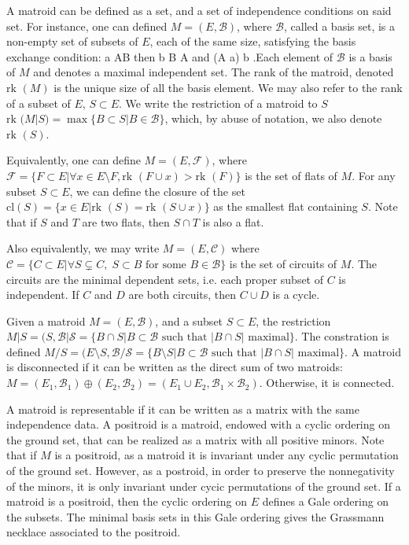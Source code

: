 \documentclass[11pt]{article}
\newcommand{\rk}{\textrm{rk }}
\def\bas #1\eas{\begin{align*} #1 \end{align*}}
\theoremstyle{remark}
\theoremstyle{definition}
\begin{document}
A matroid can be defined as a set, and a set of independence conditions on said set. For instance, one can defined $M = (E, \mathcal{B})$, where $\mathcal{B}$, called a basis set, is a non-empty set of subsets of $E$, each of the same size, satisfying the basis exchange condition: \bas \textrm{ if }  a \in A\setminus B \textrm{ then } \exists b \in B \setminus A \textrm{ and } (A \setminus a) \cup b \in  {} \;.\eas Each element of $\mathcal{B}$ is a basis of $M$ and denotes a maximal independent set. The rank of the matroid, denoted $\rk(M)$ is the unique size of all the basis element. We may also refer to the rank of a subset of $E$, $S \subset E$. We write the restriction of a matroid to $S$ $\rk(M|S) = \max \{B \subset S| B \in \mathcal{B} \}$, which, by abuse of notation, we also denote $\rk(S)$. 

Equivalently, one can define $M = (E, \mathcal{F})$, where $\mathcal{F} = \{ F \subset E| \forall x \in E \setminus F, \rk(F \cup x) > \rk(F)\}$ is the set of flats of $M$. For any subset $S \subset E$, we can define the closure of the set $\textrm{cl}(S)  = \{x \in E | \rk(S) = \rk(S \cup x)\}$ as the smallest flat containing $S$. Note that if $S$ and $T$ are two flats, then $S \cap T$ is also a flat. 

Also equivalently, we may write $M = (E, \mathcal{C})$ where $\mathcal{C} = \{C \subset E | \forall S \subsetneq C, \; S \subset B \textrm{ for some } B \in \mathcal{B}\}$ is the set of circuits of $M$. The circuits are the minimal dependent sets, i.e. each proper subset of $C$ is independent. If $C$ and $D$ are both circuits, then $C \cup D$ is a cycle. 

Given a matroid $M = (E, \mathcal{B})$, and a subset $S \subset E$, the restriction $M|S = (S, \mathcal{B|S} = \{B\cap S| B \subset \mathcal{B} \textrm{ such that } |B \cap S| \textrm{ maximal} \}$. The constration is defined $M/S = (E \setminus S, \mathcal{B/S} = \{B\setminus S| B \subset \mathcal{B} \textrm{ such that } |B \cap S| \textrm{ maximal}\}$. A matroid is disconnected if it can be written as the direct sum of two matroids: $M = (E_1, \mathcal{B}_1) \oplus (E_2, \mathcal{B}_2)  = (E_1 \cup E_2 , \mathcal{B}_1 \times \mathcal{B}_2)$. Otherwise, it is connected.

A matroid is representable if it can be written as a matrix with the same independence data. A positroid is a matroid, endowed with a cyclic ordering on the ground set, that can be realized as a matrix with all positive minors. Note that if $M$ is a positroid, as a matroid it is invariant under any cyclic permutation of the ground set. However, as a postroid, in order to  preserve the nonnegativity of the minors, it is only invariant under cycic permutations of the ground set. If a matroid is a positroid, then the cyclic ordering on $E$ defines a Gale ordering on the subsets. The minimal basis sets in this Gale ordering gives the Grassmann necklace associated to the positroid. 
\end{document}
